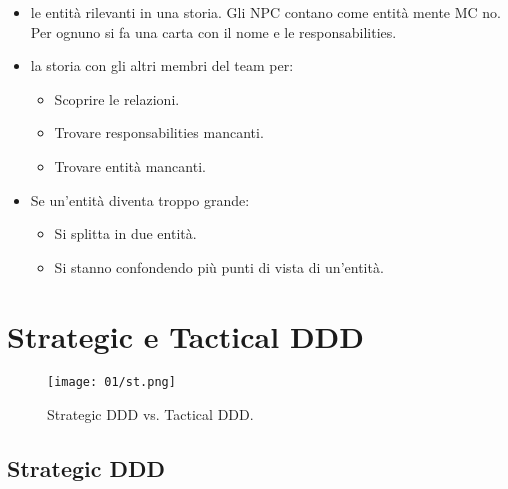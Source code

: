 \begin{itemize}
	\item {} le entità rilevanti in una storia. Gli NPC contano come entità mente MC no. Per ognuno si fa una carta con il nome e le responsabilities.
	\item {} la storia con gli altri membri del team per:
	      \begin{itemize}
		      \item Scoprire le relazioni.
		      \item Trovare responsabilities mancanti.
		      \item Trovare entità mancanti.
	      \end{itemize}
	\item Se un'entità diventa troppo grande:
	      \begin{itemize}
		      \item Si splitta in due entità.
		      \item Si stanno confondendo più punti di vista di un'entità.
	      \end{itemize}
\end{itemize}

\section{Strategic e Tactical DDD}

\begin{figure}[h]
	\begin{center}
		\texttt{[image: 01/st.png]}
	\end{center}
	\caption{Strategic DDD vs. Tactical DDD.}
\end{figure}

\subsection{Strategic DDD}


